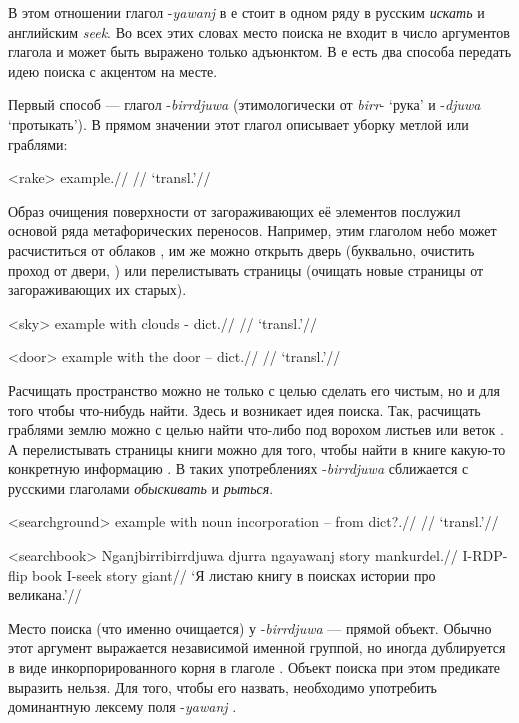 В этом отношении глагол -\textit{yawanj} в  е стоит в одном ряду в русским \textit{искать} и английским \textit{seek}. Во всех этих словах место поиска не входит в число аргументов глагола и может быть выражено только адъюнктом. В  е есть два способа передать идею поиска с акцентом на месте. 

Первый способ --- глагол -\textit{birrdjuwa} (этимологически от \textit{birr}- `рука' и -\textit{djuwa} `протыкать'). В прямом значении этот глагол описывает уборку метлой или граблями:

\ex<rake>\begingl
\gla example.//
\glb //
\glft `transl.'\trailingcitation{[src]}//
\endgl\xe

Образ очищения поверхности от загораживающих её элементов послужил основой ряда метафорических переносов. Например, этим глаголом небо может расчиститься от облаков , им же можно открыть дверь (буквально, очистить проход от двери, ) или перелистывать страницы (очищать новые страницы от загораживающих их старых).

\ex<sky>\begingl
\gla example with clouds - dict.//
\glb //
\glft `transl.'\trailingcitation{[src]}//
\endgl\xe

\ex<door>\begingl
\gla example with the door -- dict.//
\glb //
\glft `transl.'\trailingcitation{[src]}//
\endgl\xe

Расчищать пространство можно не только с целью сделать его чистым, но и для того чтобы что-нибудь найти. Здесь и возникает идея поиска. Так, расчищать граблями землю можно с целью  найти что-либо под ворохом листьев или веток . А перелистывать страницы книги можно для того, чтобы найти в книге какую-то конкретную информацию . В таких употреблениях -\textit{birrdjuwa} сближается с русскими глаголами \textit{обыскивать} и \textit{рыться}.

\ex<searchground>\begingl
\gla example with noun incorporation -- from dict?.//
\glb //
\glft `transl.'\trailingcitation{[src]}//
\endgl\xe

\ex<searchbook>\begingl
\gla Nganjbirribirrdjuwa djurra ngayawanj story mankurdel.//
\glb I-RDP-flip book I-seek story giant//
\glft `Я листаю книгу в поисках истории про великана.'\trailingcitation{[src]}//
\endgl\xe

Место поиска (что именно очищается) у -\textit{birrdjuwa} --- прямой объект. Обычно этот аргумент выражается независимой именной группой, но иногда дублируется в виде инкорпорированного корня в глаголе . Объект поиска при этом предикате выразить нельзя. Для того, чтобы его назвать, необходимо употребить доминантную лексему поля -\textit{yawanj} .

